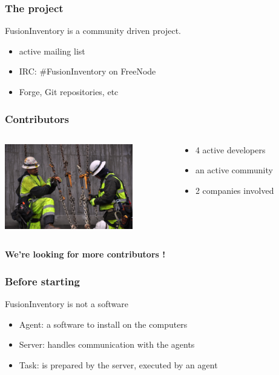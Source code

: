 \documentclass{beamer}
\begin{document}
\begin{frame}
    \frametitle{The project}
    FusionInventory is a community driven project.

    \begin{itemize}
        \item active mailing list
        \item IRC: \#FusionInventory on FreeNode
        \item Forge, Git repositories, etc
    \end{itemize}
\end{frame}


\begin{frame}
    \frametitle{Contributors}

 \begin{columns}
 \begin{column}[T]{4cm}
    \includegraphics[height=3.7cm]{./pics/worker.jpg}
 \end{column}
 \begin{column}[t]{5cm}
    \begin{itemize}
    \item 4 active developers
    \item an active community
    \item 2 companies involved
    \end{itemize}

 \end{column}
\end{columns}

    \pause
    \bf{We're looking for more contributors !}
\end{frame}



\begin{frame}
    \frametitle{Before starting}

    \begin{block}{FusionInventory is not a software}
    \begin{itemize}
        \item Agent: a software to install on the computers
        \item Server: handles communication with the agents
        \item Task: is prepared by the server, executed by an agent
    \end{itemize}
    \end{block}

\end{frame}
\end{document}
